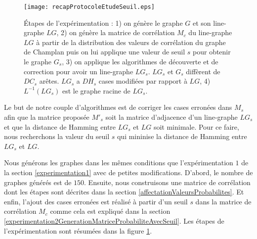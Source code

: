 \begin{figure}[htb!] 
\centering
\texttt{[image: recapProtocoleEtudeSeuil.eps]}
\caption{\'Etapes de l'exp\'erimentation :  
1) on g\'en\`ere le graphe $G$ et son line-graphe $LG$, 
2) on  g\'en\`ere la matrice de corr\'elation $M_c$ du line-graphe $LG$   \`a partir de la distribution des valeurs de corr\'elation du graphe de Champlan puis on lui applique une valeur de seuil $s$ pour obtenir le graphe $G_{s}$, 
3) on applique les algorithmes de d\'ecouverte et de correction pour avoir un line-graphe $LG_{s}$. $LG_{s}$ et  $G_{s}$ diff\`erent de $DC_{s}$ ar\^etes. $LG_{s}$ a $DH_{s}$ cases modifi\'ees par rapport \`a $LG$, 
4) $L^{-1}(LG_{s})$ est le graphe racine de $LG_{s}$. 
}
\label{recapProtocoleEtudeSeuil} 
\end{figure}

Le but de notre couple d'algorithmes est de corriger les cases erron\'ees dans $M_s$ afin que la matrice propos\'ee $M'_{s}$ soit la matrice d'adjacence d'un line-graphe $LG_s$ et que la distance de Hamming entre $LG_s$ et $LG$ soit minimale. 
Pour ce faire, nous recherchons la valeur du seuil $s$ qui mininise la distance de Hamming entre $LG_s$ et $LG$.
\newline

Nous g\'en\'erons les graphes dans les m\^emes conditions que l'exp\'erimentation $1$ de la section \ref{experimentation1} avec de petites modifications. D'abord, le nombre de graphes g\'en\'er\'es est de $150$. Ensuite, nous construisons une matrice de corr\'elation dont les \'etapes sont d\'ecrites dans la section \ref{affectationValeursProbabilites}. Et enfin, l'ajout des cases erron\'ees est r\'ealis\'e \`a partir d'un seuil $s$ dans la matrice de corr\'elation $M_c$ comme cela est expliqu\'e dans la section \ref{experimentation2GenerationMatriceProbabiliteAvecSeuil}. 
Les \'etapes de l'exp\'erimentation sont r\'esum\'ees dans la figure \ref{recapProtocoleEtudeSeuil}.

